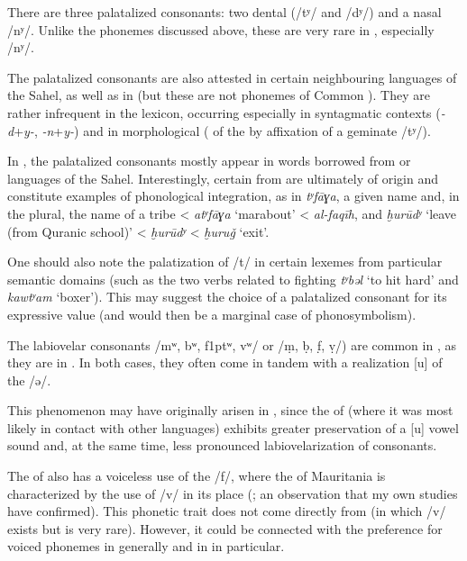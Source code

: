 \documentclass[output=paper]{langsci/langscibook}
\begin{document}
There are three palatalized consonants: two dental (/tʸ/ and /dʸ/) and a nasal /nʸ/. Unlike the phonemes discussed above, these are very rare in , especially /nʸ/.

The palatalized consonants are also attested in certain neighbouring languages of the Sahel, as well as in  (but these are not phonemes of Common ). They are rather infrequent in the  lexicon, occurring especially in syntagmatic contexts (\textit{{}-d}+\textit{y-}, \textit{{}-n}+\textit{y-}) and in morphological  ( of the  by affixation of a geminate /tʸ/).

In , the palatalized consonants mostly appear in words borrowed from  or languages of the Sahel. Interestingly, certain  from  are ultimately of  origin and constitute examples of phonological integration, as in \textit{tʸfāɣa}, a given name and, in the plural, the name of a tribe <  \textit{atʸfāɣa} ‘marabout’ <  \textit{al-faqīh}, and \textit{ḫurūdʸ} ‘leave (from Quranic school)’ <  \textit{ḫurūdʸ} <  \textit{ḫuruǧ} ‘exit’.

One should also note the palatization of /t/ in certain lexemes from particular semantic domains (such as the two verbs related to fighting \textit{tʸbəl} ‘to hit hard’ and \textit{kawtʸam} ‘boxer’). This may suggest the choice of a palatalized consonant for its expressive value (and would then be a marginal case of phonosymbolism).

The labiovelar consonants /mʷ, bʷ, f\kern 1ptʷ, vʷ/ or /ṃ, ḅ, f̣, ṿ/) are common in , as they are in . In both cases, they often come in tandem with a realization [u] of the  /ə/. 

This phenomenon may have originally arisen in , since the  of  (where it was most likely in contact with other languages) exhibits greater preservation of a [u] vowel sound and, at the same time, less pronounced labiovelarization of consonants. 

The  of  also has a voiceless use of the  /f/, where the  of Mauritania is characterized by the use of /v/ in its place (\citealt{Heath2004}; an observation that my own studies have confirmed). This phonetic trait does not come directly from  (in which /v/ exists but is very rare). However, it could be connected with the preference for voiced phonemes in  generally and in  in particular.
\end{document}
